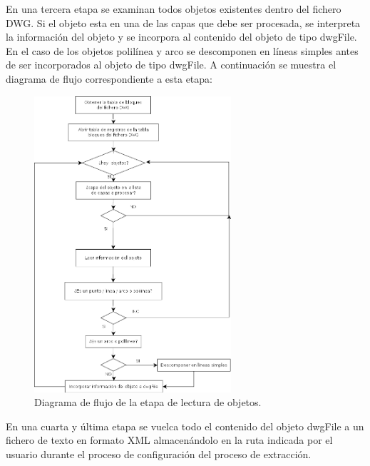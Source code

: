 \begin{itemize}
En una tercera etapa se examinan todos objetos existentes dentro del fichero DWG. Si el objeto esta en una de las capas que debe ser procesada, se interpreta la información del objeto y se incorpora al contenido del objeto de tipo dwgFile. En el caso de los objetos polilínea y arco se descomponen en líneas simples antes de ser incorporados al objeto de tipo dwgFile. A continuación se muestra el diagrama de flujo correspondiente a esta etapa:

\begin{figure}[H]
\begin{center}
\includegraphics[width=0.65\textwidth]{imgs/diagramaFlujo3}
\caption{Diagrama de flujo de la etapa de lectura de objetos.}
\end{center}
\end{figure}

En una cuarta y última etapa se vuelca todo el contenido del objeto dwgFile a un fichero de texto en formato XML almacenándolo en la ruta indicada por el usuario durante el proceso de configuración del proceso de extracción.

\end{itemize}
